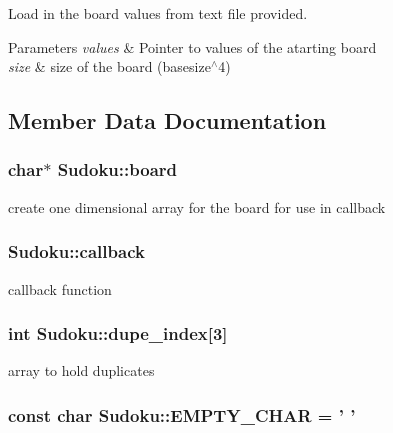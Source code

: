 Load in the board values from text file provided. 


\begin{DoxyParams}{Parameters}
{\em values} & Pointer to values of the atarting board\\
\hline
{\em size} & size of the board (basesize$^\wedge$4) \\
\hline
\end{DoxyParams}


\subsection{Member Data Documentation}
\hypertarget{classSudoku_a2c25d58e03cdc46ec8774a449fd32d81}{
\subsubsection[{board}]{\setlength{\rightskip}{0pt plus 5cm}char$\ast$ Sudoku\-::board\hspace{0.3cm}{\ttfamily [private]}}}\label{classSudoku_a2c25d58e03cdc46ec8774a449fd32d81}
create one dimensional array for the board for use in callback \hypertarget{classSudoku_a276e4848efaf2ab0738752016059bd4d}{
\subsubsection[{callback}]{ Sudoku\-::callback\hspace{0.3cm}{\ttfamily [private]}}}\label{classSudoku_a276e4848efaf2ab0738752016059bd4d}
callback function \hypertarget{classSudoku_a0287c0bedbbcac2944df596d5aa11248}{
\subsubsection[{dupe\-\_\-index}]{\setlength{\rightskip}{0pt plus 5cm}int Sudoku\-::dupe\-\_\-index\mbox{[}3\mbox{]}\hspace{0.3cm}{\ttfamily [private]}}}\label{classSudoku_a0287c0bedbbcac2944df596d5aa11248}
array to hold duplicates \hypertarget{classSudoku_a86b04a41ba0123d8b64a662087f9657d}{
\subsubsection[{E\-M\-P\-T\-Y\-\_\-\-C\-H\-A\-R}]{\setlength{\rightskip}{0pt plus 5cm}const char Sudoku\-::\-E\-M\-P\-T\-Y\-\_\-\-C\-H\-A\-R = ' '\hspace{0.3cm}{\ttfamily [static]}}}\label{classSudoku_a86b04a41ba0123d8b64a662087f9657d}
